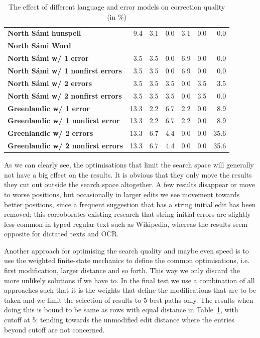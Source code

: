 \documentclass[a4paper,12pt]{article}
\begin{document}
\begin{table}
\begin{tabular}{|l|r|r|r|r|r|r|}
        \bf North Sámi hunspell & 9.4 & 3.1 & 0.0 & 3.1 & 0.0 & 0.0 \\
            \bf North Sámi Word & & \\
        \hline
        \bf North Sámi w/ 1 error & 3.5 & 3.5 & 0.0 & 6.9 & 0.0 & 0.0 \\
        \bf North Sámi w/ 1 nonfirst errors & 3.5 & 3.5 & 0.0 & 6.9 & 0.0 & 0.0\\
        \bf North Sámi w/ 2 errors & 3.5 & 3.5 & 3.5 & 0.0 & 3.5 & 3.5 \\
        \bf North Sámi w/ 2 nonfirst errors & 3.5 & 3.5 & 3.5 & 0.0 & 3.5 & 0.0\\
        \hline
          \bf Greenlandic w/ 1 error & 13.3 & 2.2 & 6.7 & 2.2 & 0.0 & 8.9 \\
 \bf Greenlandic w/ 1 nonfirst error & 13.3 & 2.2 & 6.7 & 2.2 & 0.0 & 8.9 \\
         \bf Greenlandic w/ 2 errors & 13.3 & 6.7 & 4.4 & 0.0 & 0.0 & 35.6 \\
\bf Greenlandic w/ 2 nonfirst errors & 13.3 & 6.7 & 4.4 & 0.0 & 0.0 & 35.6 \\
        \hline
    \end{tabular}
    \caption{The effect of different language and error models on correction 
        quality (in \%)
    \label{table:quality}}
\end{table}

As we can clearly see, the optimisations that limit the search space will
generally not have a big effect on the results. It is obvious that they only
move the results they cut out outside the search space altogether. A few
results disappear or move to worse positions, but occasionally in larger edits
we see movement towards better positions, since a frequent suggestion that has
a string initial edit has been removed; this corroborates existing research
that string initial errors are slightly less common in typed regular text such
as Wikipedia, whereas the results seem opposite for dictated texts and OCR.

Another approach for optimising the search quality and maybe even speed
is to use the weighted finite-state mechanics to define the common
optimisations, i.e. first modification, larger distance and so forth. This way
we only discard the more unlikely solutions if we have to. In the final test we
use a combination of all approaches such that it is the weights that define the
modifications that are to be taken and we limit the selection of results to 5
best paths only. The results when doing this is bound to be same as rows with
equal distance in Table~\ref{table:quality}, with cutoff at 5; tending
towards the unmodified edit distance where the entries beyond cutoff are not
concerned.
\end{document}
